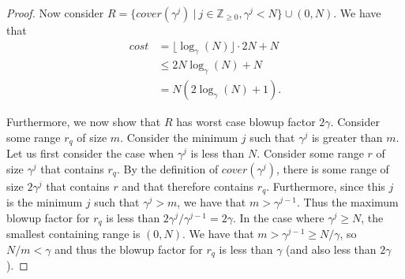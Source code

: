 \documentclass{article}
\theoremstyle{plain}
\theoremstyle{definition}
\theoremstyle{remark}
\newcommand{\julian}[1]{{\color{red}{\bf Julian:} #1}}
\newcommand{\josh}[1]{{\color{orange}{\bf Josh:} #1}}
\begin{document}
\begin{proof}
Now consider $R = \{cover(\gamma^j) \ |\ j \in \mathbb{Z}_{\ge 0}, \gamma^j < N\} \cup {(0, N)}$. We have that 
\begin{align*}
    cost &= \lfloor \log_{\gamma}(N) \rfloor \cdot 2N + N\\
    &\le 2N\log_{\gamma}(N) + N\\
    &= N\left(2\log_\gamma(N) + 1\right).
\end{align*}

Furthermore, we now show that $R$ has worst case blowup factor $2\gamma$.
Consider some range $r_q$ of size $m$. Consider the minimum $j$ such that $\gamma^j$ is greater than $m$. Let us first consider the case when $\gamma^j$ is less than $N$. Consider some range $r$ of size $\gamma^j$ that contains $r_q$. By the definition of $cover(\gamma^j)$, there is some range of size $2\gamma^j$ that contains $r$ and that therefore contains $r_q$. Furthermore, since this $j$ is the minimum $j$ such that $\gamma^j > m$, we have that $m > \gamma^{j - 1}$. Thus the maximum blowup factor for $r_q$ is less than $2\gamma^j / \gamma^{j - 1} = 2\gamma$. In the case where $\gamma^j \ge N$, the smallest containing range is $(0, N)$. We have that $m > \gamma^{j - 1} \ge N / \gamma$, so $N / m < \gamma$ and thus the blowup factor for $r_q$ is less than $\gamma$ (and also less than $2\gamma$).

\end{proof}
\end{document}
